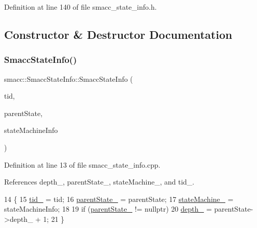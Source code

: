 Definition at line 140 of file smacc\+\_\+state\+\_\+info.\+h.



\subsection{Constructor \& Destructor Documentation}
\mbox{\label{classsmacc_1_1introspection_1_1SmaccStateInfo_a262bc6242d8a3b2c29c34b4cf325dfb4}} 
\subsubsection{\texorpdfstring{Smacc\+State\+Info()}{SmaccStateInfo()}}
{\footnotesize\ttfamily smacc\+::\+Smacc\+State\+Info\+::\+Smacc\+State\+Info (\begin{DoxyParamCaption}\item[{const std\+::type\+\_\+info $\ast$}]{tid,  }\item[{std\+::shared\+\_\+ptr$<$ \hyperlink{classsmacc_1_1introspection_1_1SmaccStateInfo}{Smacc\+State\+Info} $>$}]{parent\+State,  }\item[{std\+::shared\+\_\+ptr$<$ \hyperlink{classsmacc_1_1introspection_1_1SmaccStateMachineInfo}{Smacc\+State\+Machine\+Info} $>$}]{state\+Machine\+Info }\end{DoxyParamCaption})}



Definition at line 13 of file smacc\+\_\+state\+\_\+info.\+cpp.



References depth\+\_\+, parent\+State\+\_\+, state\+Machine\+\_\+, and tid\+\_\+.


\begin{DoxyCode}
14 \{
15     \hyperlink{classsmacc_1_1introspection_1_1SmaccStateInfo_a37d0d0bce171b57b8d3a39f44ab45248}{tid\_} = tid;
16     \hyperlink{classsmacc_1_1introspection_1_1SmaccStateInfo_afa49a141d2ccdb3d6f9676ed380ce006}{parentState\_} = parentState;
17     \hyperlink{classsmacc_1_1introspection_1_1SmaccStateInfo_a74685e4540842ee292a80a1db44818bb}{stateMachine\_} = stateMachineInfo;
18 
19     \textcolor{keywordflow}{if} (\hyperlink{classsmacc_1_1introspection_1_1SmaccStateInfo_afa49a141d2ccdb3d6f9676ed380ce006}{parentState\_} != \textcolor{keyword}{nullptr})
20         \hyperlink{classsmacc_1_1introspection_1_1SmaccStateInfo_a7e97a482ca49057f27e638268d1a3189}{depth\_} = parentState->depth\_ + 1;
21 \}
\end{DoxyCode}


